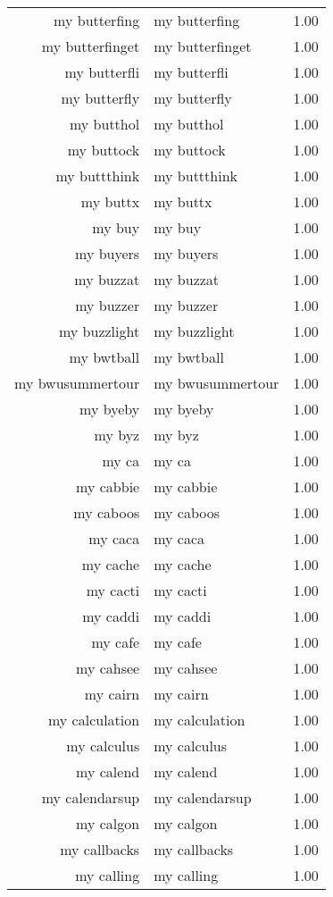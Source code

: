 \begin{table}[ht]
\begin{tabular}{rlr}
  my butterfing & my butterfing & 1.00 \\ 
  my butterfinget & my butterfinget & 1.00 \\ 
  my butterfli & my butterfli & 1.00 \\ 
  my butterfly & my butterfly & 1.00 \\ 
  my butthol & my butthol & 1.00 \\ 
  my buttock & my buttock & 1.00 \\ 
  my buttthink & my buttthink & 1.00 \\ 
  my buttx & my buttx & 1.00 \\ 
  my buy & my buy & 1.00 \\ 
  my buyers & my buyers & 1.00 \\ 
  my buzzat & my buzzat & 1.00 \\ 
  my buzzer & my buzzer & 1.00 \\ 
  my buzzlight & my buzzlight & 1.00 \\ 
  my bwtball & my bwtball & 1.00 \\ 
  my bwusummertour & my bwusummertour & 1.00 \\ 
  my byeby & my byeby & 1.00 \\ 
  my byz & my byz & 1.00 \\ 
  my ca & my ca & 1.00 \\ 
  my cabbie & my cabbie & 1.00 \\ 
  my caboos & my caboos & 1.00 \\ 
  my caca & my caca & 1.00 \\ 
  my cache & my cache & 1.00 \\ 
  my cacti & my cacti & 1.00 \\ 
  my caddi & my caddi & 1.00 \\ 
  my cafe & my cafe & 1.00 \\ 
  my cahsee & my cahsee & 1.00 \\ 
  my cairn & my cairn & 1.00 \\ 
  my calculation & my calculation & 1.00 \\ 
  my calculus & my calculus & 1.00 \\ 
  my calend & my calend & 1.00 \\ 
  my calendarsup & my calendarsup & 1.00 \\ 
  my calgon & my calgon & 1.00 \\ 
  my callbacks & my callbacks & 1.00 \\ 
  my calling & my calling & 1.00 \\ 

\end{tabular}
\end{table}
